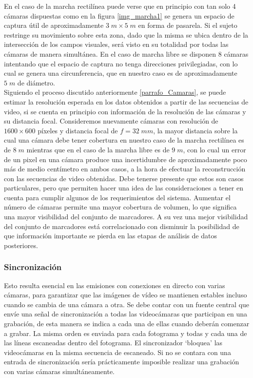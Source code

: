 En el caso de la marcha rectilínea puede verse que en principio con tan solo 4 cámaras dispuestas como en la figura \ref{img_marcha1} se genera un espacio de captura útil de aproximadamente $3\;m\times5\; m$ en forma de pasarela. Si el sujeto restringe su movimiento sobre esta zona, dado que la misma se ubica dentro de la intersección de los campos visuales, será visto en su totalidad por todas las cámaras de manera simultánea. En el caso de marcha libre se disponen 8 cámaras intentando que el espacio de captura no tenga direcciones privilegiadas, con lo cual se genera una circunferencia, que en nuestro caso es de aproximadamente $5\;m$ de diámetro. \\
Siguiendo el proceso discutido anteriormente \ref{parrafo_Camaras}, se puede estimar la resolución esperada en los datos obtenidos a partir de las secuencias de video, si se cuenta en principio con información de la resolución de las cámaras y su distancia focal. Consideremos nuevamente cámaras con resolución de $1600\times600$ píxeles y distancia focal de $f=32\;mm$, la mayor distancia sobre la cual una cámara debe tener cobertura en nuestro caso de la marcha rectilínea es de $8 \;m$ mientras que en el caso de la marcha libre es de $9\;m$, con lo cual un error de un pixel en una cámara produce una incertidumbre de aproximadamente poco más de medio centímetro en ambos casos, a la hora de efectuar la reconstrucción con las secuencias de video obtenidas. 
Debe tenerse presente que estos son casos particulares, pero que permiten hacer una idea de las consideraciones a tener en cuenta para cumplir algunos de los requerimientos del sistema. 
Aumentar el número de cámaras permite una mayor cobertura de volumen, lo que significa una mayor visibilidad del conjunto de marcadores. A su vez una mejor visibilidad del conjunto de marcadores está correlacionado con disminuir la posibilidad de que información importante se pierda en las etapas de análisis de datos posteriores.


\subsubsection{Sincronización \cite{canon}} 

Esto resulta esencial en las emisiones con conexiones en directo con varias cámaras, para garantizar que las imágenes de vídeo se mantienen estables incluso cuando se cambia de una cámara a otra.
Se debe contar con un fuente central que envíe una señal de sincronización a todas las videocámaras que participan en una grabación, de esta manera se indica a cada una de ellas cuando deberán comenzar a grabar. La misma orden es enviada para cada fotograma y todas y cada una de las líneas escaneadas dentro del fotograma. El sincronizador ‘bloquea’ las videocámaras en la misma secuencia de escaneado.
Si no se contara con una entrada de sincronización sería prácticamente imposible realizar una grabación con varias cámaras simultáneamente.


